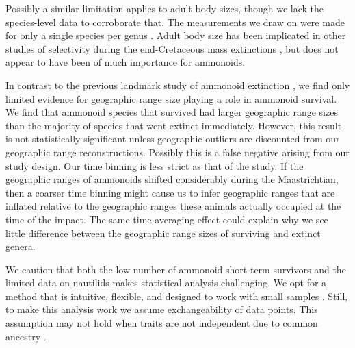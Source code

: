 \documentclass[a4paper]{article}
\begin{document}
Possibly a similar limitation applies to adult body sizes, though we lack the species-level data to corroborate that. The measurements we draw on were made for only a single species per genus \parencite{heimCopesRuleEvolution2015, payneBodySizeSampling2020}. Adult body size has been implicated in other studies of selectivity during the end-Cretaceous mass extinctions \parencite{yingDarknessBodySize2026, friedmanEcomorphologicalSelectivityMarine2009, longrichMassExtinctionLizards2012}, but does not appear to have been of much importance for ammonoids.



In contrast to the previous landmark study of ammonoid extinction \parencite{landmanAmmoniteExtinctionNautilid2014}, we find only limited evidence for geographic range size playing a role in ammonoid survival. We find that ammonoid species that survived had larger geographic range sizes than the majority of species that went extinct immediately. However, this result is not statistically significant unless geographic outliers are discounted from our geographic range reconstructions. 
Possibly this is a false negative arising from our study design. Our time binning is less strict as that of the \textcite{landmanAmmoniteExtinctionNautilid2014} study. If the geographic ranges of ammonoids shifted considerably during the Maastrichtian, then a coarser time binning might cause us to infer geographic ranges that are inflated relative to the geographic ranges these animals actually occupied at the time of the impact.
The same time-averaging effect could explain why we see little difference between the geographic range sizes of surviving and extinct genera. 



We caution that both the low number of ammonoid short-term survivors and the limited data on nautilids makes statistical analysis challenging. 
We opt for a method that is intuitive, flexible, and designed to work with small samples \parencite{permeConfidenceIntervalsMann2019}. 
Still, to make this analysis work we assume exchangeability of data points. This assumption may not hold when traits are not independent due to common ancestry
\parencite{churchillNaiveApplicationPermutation2008, felsensteinPhylogeniesComparativeMethod1985}.
\end{document}
